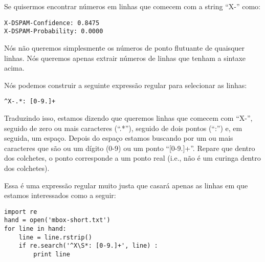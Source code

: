 Se quisermos encontrar números em linhas que comecem com a string ``X-'' como:

\beforeverb
\begin{verbatim}
X-DSPAM-Confidence: 0.8475
X-DSPAM-Probability: 0.0000  
\end{verbatim}
\afterverb
%

Nós não queremos simplesmente os números de ponto flutuante de quaisquer linhas. 
Nós queremos apenas extrair números de linhas que tenham a sintaxe acima.

Nós podemos construir a seguinte expressão regular para selecionar as linhas:

\beforeverb
\begin{verbatim}
^X-.*: [0-9.]+
\end{verbatim}
\afterverb
%

Traduzindo isso, estamos dizendo que queremos linhas que comecem com ``X-'', seguido de
zero ou mais caracteres (``.*''), seguido de dois pontos (``:'') e, em seguida, um espaço. 
Depois do espaço estamos buscando por um ou mais caracteres que são ou um dígito (0-9) ou um 
ponto ``[0-9.]+''. Repare que dentro dos colchetes, o ponto corresponde a um ponto real (i.e., 
não é um curinga dentro dos colchetes).

Essa é uma expressão regular muito justa que casará apenas as linhas em que estamos interessados
como a seguir:

\beforeverb
\begin{verbatim}
import re
hand = open('mbox-short.txt')
for line in hand:
    line = line.rstrip()
    if re.search('^X\S*: [0-9.]+', line) :
        print line
\end{verbatim}
\afterverb
%


